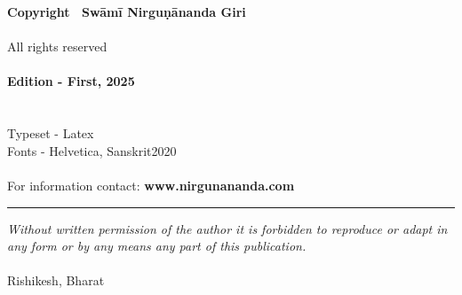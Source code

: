 \thispagestyle{empty} 
\arialUC 
{\textbf{Copyright \textcopyright\ Swāmī  Nirguṇānanda Giri}}\\
\\
All rights reserved\\
\\
\textbf{Edition - First, 2025}\\
\\
\vspace{1cm}\\
Typeset - Latex\\
Fonts - Helvetica, Sanskrit2020\\
\vspace{1cm}\\
For information contact: \textbf{www.nirgunananda.com}\\
\vfill
\rule{\textwidth}{2pt}
\emph{Without written permission of the author it is forbidden to reproduce or adapt in any form or by any means any part of this  publication.}\\
\\
Rishikesh, Bharat\\
\newpage